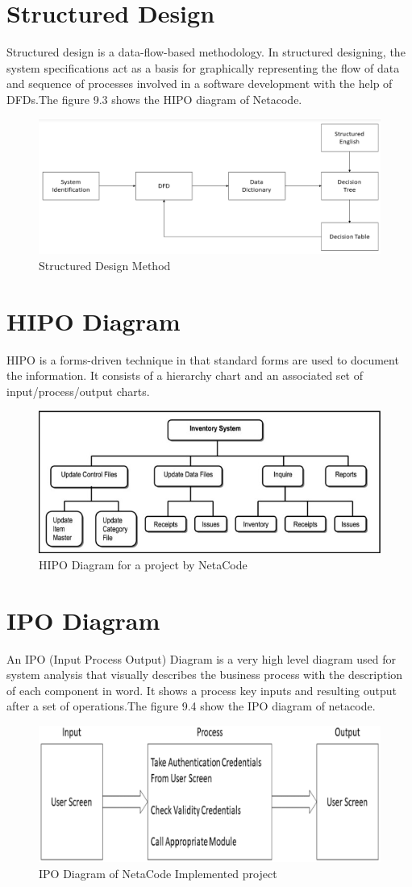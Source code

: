 \documentclass[a4paper,12pt]{report}
\begin{document}
\section{Structured Design}

Structured design is a data-flow-based methodology.  In structured designing, the system specifications act as a basis for graphically representing the flow of data and sequence of processes involved in a software development with the help of DFDs.The figure 9.3 shows the HIPO diagram of Netacode.


\begin{figure}[h]
	\centering
	\includegraphics[width=0.8\linewidth]{9_2}
	\caption{Structured Design Method}
	\label{fig:92}
\end{figure}
\section{HIPO Diagram}
HIPO is a forms-driven technique in that standard forms are used to document the information. It consists of a hierarchy chart and an associated set of input/process/output charts. 
\begin{figure}
	\centering
	\includegraphics[width=0.7\linewidth]{9_3}
	\caption{HIPO Diagram for a project by NetaCode}
	\label{fig:93}
\end{figure}
\section{IPO Diagram}
An IPO (Input Process Output) Diagram is a very high level diagram used for system analysis that visually describes the business process with the description of each component in word. It shows a process key inputs and resulting output after a set of operations.The figure 9.4 show the IPO diagram of netacode.
\begin{figure}
	\centering
	\includegraphics[width=0.7\linewidth]{9_4}
	\caption{IPO Diagram of NetaCode Implemented project}
	\label{fig:94}
\end{figure}
\end{document}
